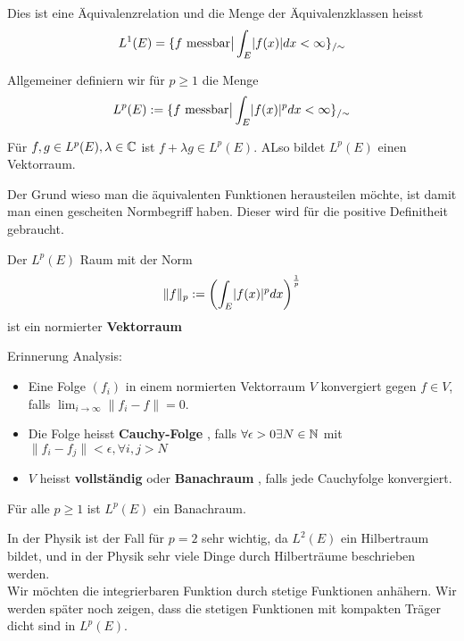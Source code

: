 Dies ist eine Äquivalenzrelation und die Menge der Äquivalenzklassen heisst
\begin{align*}
				L^1(E) = \{f \text{ messbar}\big\vert \int_E \abs{f(x)} dx < \infty\}_{/\sim}
\end{align*}

Allgemeiner definiern wir für $p \geq 1$ die Menge
\begin{align*}
				L^p(E) := \{f \text{ messbar} \big\vert \int_E \abs{f(x)}^p dx < \infty\}_{/\sim}
\end{align*}


\begin{lemma}[]
				Für $f,g \in L^p(E), \lambda \in \mathbb{C}$ ist $f + \lambda g \in L^p(E)$. ALso bildet $L^p(E)$ einen Vektorraum.
\end{lemma}

Der Grund wieso man die äquivalenten Funktionen herausteilen möchte, ist damit man einen gescheiten Normbegriff haben. Dieser wird für die positive Definitheit gebraucht.
\begin{satz}[]
Der $L^p(E)$ Raum mit der Norm
\begin{align*}
				\|f\|_p := \left(\int_E\abs{f(x)}^p dx\right)^\frac{1}{p}
\end{align*}
ist ein normierter \textbf{Vektorraum} 
\end{satz}


Erinnerung Analysis:
\begin{itemize}
\item 	Eine Folge $(f_i)$ in einem normierten Vektorraum $V$ konvergiert gegen $f \in V$, falls $\lim_{i \to \infty}\|f_i - f\| = 0$.
\item 	Die Folge heisst \textbf{Cauchy-Folge} , falls $\forall \epsilon > 0 \exists N \in \mathbb{N}$ mit $\|f_i - f_j\| < \epsilon, \forall i,j > N$
\item	$V$ heisst \textbf{vollständig} oder \textbf{Banachraum} , falls jede Cauchyfolge konvergiert.
\end{itemize}

\begin{satz}
Für alle $p \geq 1$ ist $L^p(E)$ ein Banachraum.
\end{satz}

In der Physik ist der Fall für $p = 2$ sehr wichtig, da $L^2(E)$ ein Hilbertraum bildet, und in der Physik sehr viele Dinge durch Hilberträume beschrieben werden.\\


Wir möchten die integrierbaren Funktion durch stetige Funktionen anhähern. Wir werden später noch zeigen, dass die stetigen Funktionen mit kompakten Träger dicht sind in $L^p(E)$.\\

